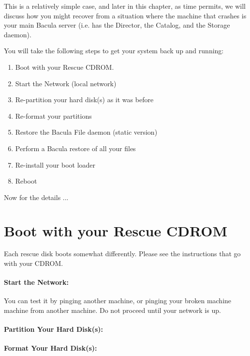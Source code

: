 This is a relatively simple case, and later in this chapter, as time permits,
we will discuss how you might recover from a situation where the machine that
crashes is your main Bacula server (i.e. has the Director, the Catalog, and
the Storage daemon). 

You will take the following steps to get your system back up and running: 

\begin{enumerate}
\item Boot with your Rescue CDROM.  
\item Start the Network (local network)  
\item Re-partition your hard disk(s) as it was before  
\item Re-format your partitions  
\item Restore the Bacula File daemon (static version)  
\item Perform a Bacula restore of all your files  
\item Re-install your boot loader  
\item Reboot 
\end{enumerate}

Now for the details ... 

\section{Boot with your Rescue CDROM}

Each rescue disk boots somewhat differently.  Please see the
instructions that go with your CDROM.


\paragraph*{Start the Network:}

\normalsize

You can test it by pinging another machine, or pinging your broken machine
machine from another machine. Do not proceed until your network is up. 

\paragraph*{Partition Your Hard Disk(s):}

\paragraph*{Format Your Hard Disk(s):}

